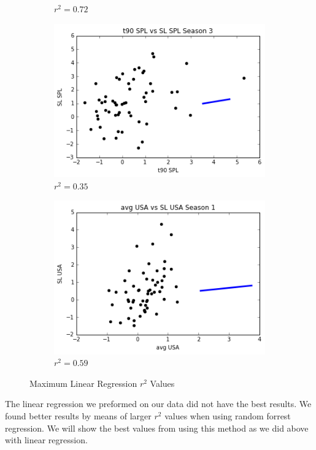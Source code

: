 \documentclass[12pt]{report}
\begin{document}
\begin{figure}[ht]
\begin{subfigure}{.5\textwidth}
\caption{$r^2 = 0.72$}
\label{fig:LinearMaxT10}
\end{subfigure}%
\begin{subfigure}{.5\textwidth}
\centering
\includegraphics[scale = .5]{T90LinearMaxS3SPL035.png}
\caption{$r^2 = 0.35$}
\label{fig:LinearMaxT90}
\end{subfigure}
\begin{subfigure}{.5\textwidth}
\centering
\includegraphics[scale = .5]{AVGLinearMaxS1USA059.png}
\caption{$r^2 = 0.59$}
\label{fig:LinearMaxAVG}
\end{subfigure}
\caption{\label{fig:example}Maximum Linear Regression $r^2$ Values}
\end{figure}

	\par The linear regression we preformed on our data did not have the best results. We found better results by means of larger $r^2$ values when using random forrest regression. We will show the best values from using this method as we did above with linear regression.

	
	
	
	
	
	
\end{document}
